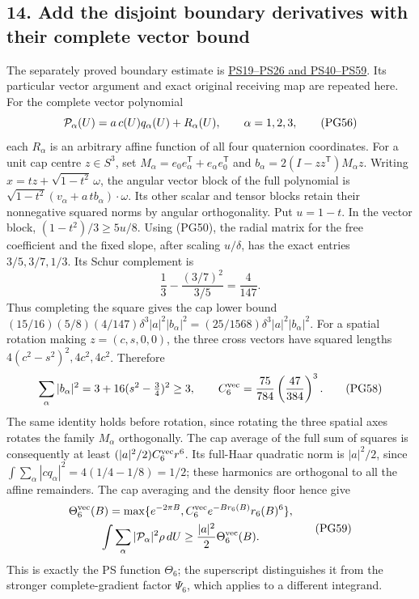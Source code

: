 \documentclass[11pt]{article}
\begin{document}
\subsection*{14. Add the disjoint boundary derivatives with their complete vector bound}

The separately proved boundary estimate is
\href{https://github.com/KokunoYumeto/yang-mills-interacting-workbench/blob/main/yang-mills/continuations/20261011-central-signs-shrinking-window/POLYNOMIAL_SCORE_AND_ORIGINAL_ENDPOINT.md}{PS19–PS26 and PS40–PS59}.
Its particular vector argument and exact original receiving map are
repeated here. For the complete vector polynomial
\[
 {\cal P}_\alpha(U)=a\,c(U)q_\alpha(U)+R_\alpha(U),
 \qquad\alpha=1,2,3,
 \tag{PG56}
\]
each \(R_\alpha\) is an arbitrary affine function of all four
quaternion coordinates. For a unit cap centre \(z\in S^3\), set
\(M_\alpha=e_0e_\alpha^{\mathsf T}+e_\alpha e_0^{\mathsf T}\)
and \(b_\alpha=2(I-zz^{\mathsf T})M_\alpha z\).
Writing \(x=t z+\sqrt{1-t^2}\,\omega\), the angular vector
block of the full polynomial is
\(\sqrt{1-t^2}(v_\alpha+a\,t b_\alpha)\cdot\omega\).
Its other scalar and tensor blocks retain their nonnegative
squared norms by angular orthogonality. Put \(u=1-t\).
In the vector block,
\((1-t^2)/3\ge5u/8\). Using (PG50), the radial matrix for
the free coefficient and the fixed slope, after scaling \(u/\delta\),
has the exact entries \(3/5,3/7,1/3\). Its Schur complement is
\[
 \frac13-\frac{(3/7)^2}{3/5}=\frac4{147}.
 \tag{PG57}
\]
Thus completing the square gives the cap lower bound
\((15/16)(5/8)(4/147)\delta^3|a|^2|b_\alpha|^2
=(25/1568)\delta^3|a|^2|b_\alpha|^2\).
For a spatial rotation making \(z=(c,s,0,0)\), the three cross
vectors have squared lengths
\(4(c^2-s^2)^2,4c^2,4c^2\). Therefore
\[
 \sum_\alpha|b_\alpha|^2
 =3+16(s^2-\tfrac34)^2\ge3,\qquad
 C_6^{\rm vec}=\frac{75}{784}\left(\frac{47}{384}\right)^3 .
 \tag{PG58}
\]
The same identity holds before rotation, since rotating the three
spatial axes rotates the family \(M_\alpha\) orthogonally.
The cap average of the full sum of squares is consequently
at least \((|a|^2/2)C_6^{\rm vec}r^6\). Its full-Haar quadratic
norm is \(|a|^2/2\), since
\(\int\sum_\alpha|cq_\alpha|^2=4(1/4-1/8)=1/2\);
these harmonics are orthogonal to all the affine remainders.
The cap averaging and the density floor hence give
\[
 \begin{gathered}
 \Theta_6^{\rm vec}(B)
 =\max\{e^{-2\pi B},
      C_6^{\rm vec}e^{-B r_6(B)}r_6(B)^6\},\\
 \int\sum_\alpha|{\cal P}_\alpha|^2\rho\,dU
                       \ge\frac{|a|^2}{2}\Theta_6^{\rm vec}(B).
 \end{gathered}\tag{PG59}
\]
This is exactly the PS function \(\Theta_6\); the superscript
distinguishes it from the stronger complete-gradient factor
\(\Psi_6\), which applies to a different integrand.
\end{document}
